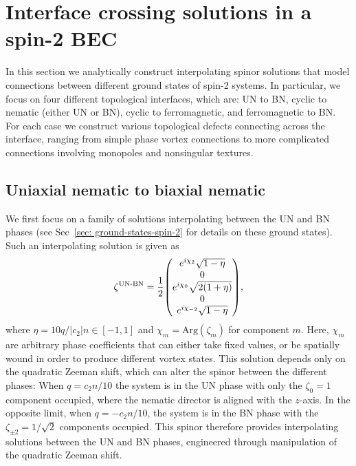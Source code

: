 \section{Interface crossing solutions in a spin-2 BEC}
In this section we analytically construct interpolating spinor solutions that
model connections between different ground states of spin-2 systems.
In particular, we focus on four different topological interfaces, which are:
UN to BN, cyclic to nematic (either UN or BN), cyclic to ferromagnetic, and
ferromagnetic to BN\@.
For each case we construct various topological defects connecting across the
interface, ranging from simple phase vortex connections to more complicated
connections involving monopoles and nonsingular textures.

\subsection{Uniaxial nematic to biaxial nematic}\label{subsec: UN-BN-defects}
We first focus on a family of solutions interpolating between the UN and BN
phases (see Sec~\ref{sec: ground-states-spin-2} for details on these ground
states).
Such an interpolating solution is given as
\begin{align}\label{eq: UN-BN-interpolating-spinor}
    \zeta^\text{UN-BN} = \frac{1}{2}\mqty(
    e^{i\chi_2}\sqrt{1 - \eta} \\
    0 \\
    e^{i\chi_0}\sqrt{2(1+\eta)} \\
    0 \\
    e^{i\chi_{-2}}\sqrt{1 - \eta}
    ),
\end{align}
where \(\eta = 10q /|c_2|n \in [-1, 1]\) and \(\chi_m = \text{Arg}(\zeta_m)\)
for component \(m\).
Here, \(\chi_m\) are arbitrary phase coefficients that can either take fixed
values, or be spatially wound in order to produce different vortex states.
This solution depends only on the quadratic Zeeman shift, which can alter the
spinor between the different phases: When \(q = c_2n / 10\) the system is in the
UN phase with only the \(\zeta_0=1\) component occupied, where the nematic
director is aligned with the \(z\)-axis.
In the opposite limit, when \(q = -c_2n/10\), the system is in the
BN phase with the \(\zeta_{\pm 2} = 1/\sqrt{2}\) components occupied.
This spinor therefore provides interpolating solutions between the UN and BN
phases, engineered through manipulation of the quadratic Zeeman shift.


